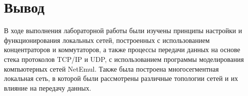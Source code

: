 \documentclass[12pt,onecolumn]{article}
\begin{document}
\section{Вывод}
В ходе выполнения лабораторной работы были изучены принципы настройки и функционирования локальных сетей, построенных с использованием концентраторов и коммутаторов, а также процессы передачи данных на основе стека протоколов TCP/IP и UDP, с использованием программы моделирования компьютерных сетей NetEmul.
Также была построена многосегментная локальная сеть, в которой были рассмотрены различные топологии сетей и их влияние на передачу данных.
\end{document}
